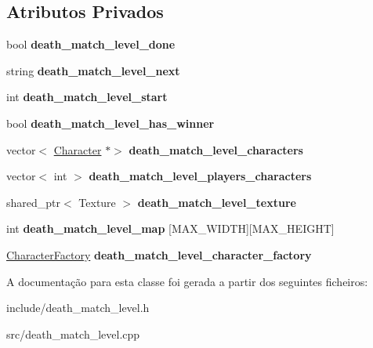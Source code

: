 \subsection*{Atributos Privados}
\begin{DoxyCompactItemize}
\item 
\mbox{\label{classDeathMatchLevel_a9c5afea6c31d61547042149f3d82c9f9}} 
bool {\bfseries death\+\_\+match\+\_\+level\+\_\+done}
\item 
\mbox{\label{classDeathMatchLevel_a970c89076994b15001bf01375b43b9b7}} 
string {\bfseries death\+\_\+match\+\_\+level\+\_\+next}
\item 
\mbox{\label{classDeathMatchLevel_aa8e4a5b754287884d0ca54643e0fdec0}} 
int {\bfseries death\+\_\+match\+\_\+level\+\_\+start}
\item 
\mbox{\label{classDeathMatchLevel_a1c75c054a33e65e4f39fed65cfd89710}} 
bool {\bfseries death\+\_\+match\+\_\+level\+\_\+has\+\_\+winner}
\item 
\mbox{\label{classDeathMatchLevel_a99aaecee24b71852c38959c62db7a5b0}} 
vector$<$ \mbox{\hyperlink{classCharacter}{Character}} $\ast$$>$ {\bfseries death\+\_\+match\+\_\+level\+\_\+characters}
\item 
\mbox{\label{classDeathMatchLevel_a83bd77eb5fa0802f98f6e032353c7954}} 
vector$<$ int $>$ {\bfseries death\+\_\+match\+\_\+level\+\_\+players\+\_\+characters}
\item 
\mbox{\label{classDeathMatchLevel_a02fcefcb12467298b804bf7426c0fc36}} 
shared\+\_\+ptr$<$ Texture $>$ {\bfseries death\+\_\+match\+\_\+level\+\_\+texture}
\item 
\mbox{\label{classDeathMatchLevel_af8fcfeb2da3f1d8b3d13ba68abab67b8}} 
int {\bfseries death\+\_\+match\+\_\+level\+\_\+map} \mbox{[}M\+A\+X\+\_\+\+W\+I\+D\+TH\mbox{]}\mbox{[}M\+A\+X\+\_\+\+H\+E\+I\+G\+HT\mbox{]}
\item 
\mbox{\label{classDeathMatchLevel_af344ee616243bccbff1170269db72956}} 
\mbox{\hyperlink{classCharacterFactory}{Character\+Factory}} {\bfseries death\+\_\+match\+\_\+level\+\_\+character\+\_\+factory}
\end{DoxyCompactItemize}


A documentação para esta classe foi gerada a partir dos seguintes ficheiros\+:\begin{DoxyCompactItemize}
\item 
include/death\+\_\+match\+\_\+level.\+h\item 
src/death\+\_\+match\+\_\+level.\+cpp\end{DoxyCompactItemize}
